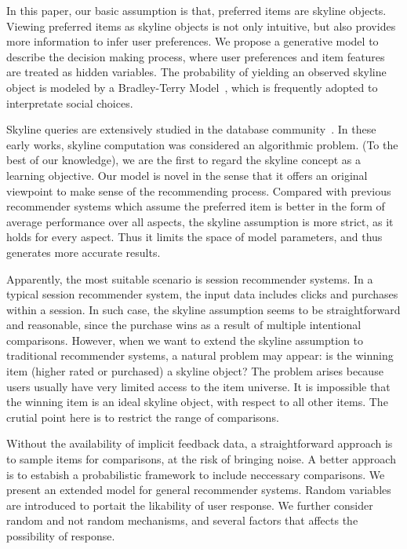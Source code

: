 \documentclass{sig-alternate}
\begin{document}
In this paper, our basic assumption is that, preferred items are skyline objects. Viewing preferred items as skyline objects is not only intuitive, but also provides more information to infer user preferences. We propose a generative model to describe the decision making process, where user preferences and item features are treated as hidden variables. The probability of yielding an observed skyline object is modeled by a Bradley-Terry Model~\cite{Hunter2004MM}, which is frequently adopted to interpretate social choices. 

Skyline queries are extensively studied in the database community~\cite{Pei2007Probabilistic}. In these early works, skyline computation was considered an algorithmic problem. (To the best of our knowledge), we are the first to regard the skyline concept as a learning objective. Our model is novel in the sense that it offers an original viewpoint to make sense of the recommending process. Compared with previous recommender systems which assume the preferred item is better in the form of average performance over all aspects, the skyline assumption is more strict, as it holds for every aspect. Thus it limits the space of model parameters, and thus generates more accurate results. 

Apparently, the most suitable scenario is session recommender systems. In a typical session recommender system, the input data includes clicks and purchases within a session. In such case, the skyline assumption seems to be straightforward and reasonable, since the purchase wins as a result of multiple intentional comparisons. However, when we want to extend the skyline assumption to traditional recommender systems, a natural problem may appear: is the winning item (higher rated or purchased) a skyline object? The problem arises because users usually have very limited access to the item universe. It is impossible that the winning item is an ideal skyline object, with respect to all other items. The crutial point here is to restrict the range of comparisons. 

Without the availability of implicit feedback data, a straightforward approach is to sample items for comparisons, at the risk of bringing noise. A better approach is to estabish a probabilistic framework to include neccessary comparisons. We present an extended model for general recommender systems. Random variables are introduced to portait the likability of user response. We further consider random and not random mechanisms, and several factors that affects the possibility of response.       
\end{document}
